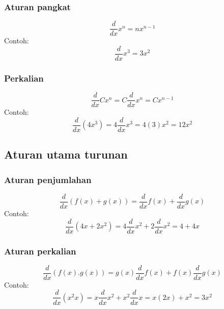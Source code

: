\subsubsection{Aturan pangkat}
\begin{equation}\label{eqn:eqn21}
    \frac{d}{dx}x^{n} = nx^{n-1}
\end{equation}
Contoh:
\begin{equation*}
    \frac{d}{dx}x^{3} = 3x^{2}
\end{equation*}

\subsubsection{Perkalian}
\begin{equation}\label{eqn:eqn22}
    \frac{d}{dx}Cx^{n} = C\frac{d}{dx}x^{n} = Cx^{n-1}
\end{equation}
Contoh:
\begin{equation*}
    \frac{d}{dx}(4x^{3}) = 4\frac{d}{dx}x^{3} = 4(3)x^{2} = 12x^{2} 
\end{equation*}
\subsection{Aturan utama turunan}

\subsubsection{Aturan penjumlahan}
\begin{equation}\label{eqn:eqn23}
\frac{d}{dx}(f(x) + g(x)) = \frac{d}{dx} f(x) + \frac{d}{dx} g(x)    
\end{equation}
Contoh:
\begin{dmath*}
    \frac{d}{dx}(4x + 2x^{2}) = 4\frac{d}{dx}x^{2} + 2\frac{d}{dx}x^{2} = 4 + 4x
\end{dmath*}
\subsubsection{Aturan perkalian}
\begin{equation}\label{eqn:eqn24}
    \frac{d}{dx}(f(x).g(x)) = g(x)\frac{d}{dx}f(x) + f(x)\frac{d}{dx}g(x)
\end{equation}
Contoh:
\begin{dmath*}
    \frac{d}{dx}(x^{2}x) = x\frac{d}{dx}x^{2} + x^{2} \frac{d}{dx}x = x(2x) + x^{2} = 3x^{2}
\end{dmath*}

